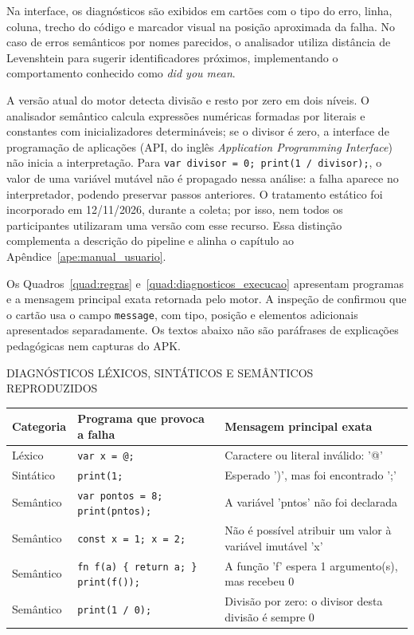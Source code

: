 \documentclass[
    12pt
    ,oneside
    ,a4paper
    ,chapter=TITLE
    ,section=TITLE
    ,sumario=abnt-6027-2012]{abntex2}
\renewcommand{\legenda}[2][]{%
    \centering
    \caption[\MakeTextUppercase{#2}]{\maybeLabel{#1}\MakeTextUppercase{#2}}%
}
\begin{document}
Na interface, os diagnósticos são exibidos em cartões com o tipo do erro, linha, coluna, trecho
do código e marcador visual na posição aproximada da falha. No caso de erros semânticos por nomes
parecidos, o analisador utiliza distância de Levenshtein para sugerir identificadores próximos,
implementando o comportamento conhecido como \textit{did you mean}.

A versão atual do motor detecta divisão e resto por zero em dois níveis. O analisador
semântico calcula expressões numéricas formadas por literais e constantes com
inicializadores determináveis; se o divisor é zero, a interface de programação de aplicações (API, do inglês \textit{Application Programming Interface}) não inicia a interpretação.
Para \texttt{var divisor = 0; print(1 / divisor);}, o valor de uma variável
mutável não é propagado nessa análise: a falha aparece no interpretador, podendo
preservar passos anteriores. O tratamento estático foi incorporado em 12/11/2026, durante a coleta; por isso,
nem todos os participantes utilizaram uma versão com esse recurso. Essa distinção complementa a descrição do
pipeline e alinha o capítulo ao Apêndice~\ref{ape:manual_usuario}.

Os Quadros~\ref{quad:regras} e~\ref{quad:diagnosticos_execucao} apresentam programas
e a mensagem principal exata retornada pelo motor. A inspeção de
 confirmou que o cartão usa o campo \texttt{message},
com tipo, posição e elementos adicionais apresentados separadamente. Os textos
abaixo não são paráfrases de explicações pedagógicas nem capturas do APK.

\begin{quadro}[htb]
\centering
\legenda[quad:regras]{Diagnósticos léxicos, sintáticos e semânticos reproduzidos}
\footnotesize
\begin{tabular}{|P{1.8cm}|P{4.4cm}|P{6.5cm}|}
\hline
Categoria & Programa que provoca a falha & Mensagem principal exata \\
\hline\hline
Léxico & \texttt{var x = @;} & Caractere ou literal inválido: '@' \\
\hline
Sintático & \texttt{print(1;} & Esperado ')', mas foi encontrado ';' \\
\hline
Semântico & \texttt{var pontos = 8; print(pntos);} & A variável 'pntos' não foi declarada \\
\hline
Semântico & \texttt{const x = 1; x = 2;} & Não é possível atribuir um valor à variável imutável 'x' \\
\hline
Semântico & \texttt{fn f(a) \{ return a; \} print(f());} & A função 'f' espera 1 argumento(s), mas recebeu 0 \\
\hline
Semântico & \texttt{print(1 / 0);} & Divisão por zero: o divisor desta divisão é sempre 0 \\
\hline
\end{tabular}
\vspace{0.2cm}
\end{quadro}
\FloatBarrier
\end{document}
